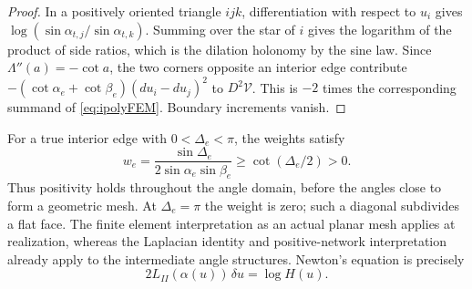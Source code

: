 \documentclass[11pt,a4paper]{article}
\numberwithin{equation}{section}
\theoremstyle{definition}
\theoremstyle{remark}
\begin{document}
\begin{proof}
In a positively oriented triangle $ijk$, differentiation with respect
to $u_i$ gives
$\log(\sin\alpha_{t,j}/\sin\alpha_{t,k})$.
Summing over the star of $i$ gives the logarithm of the product of
side ratios, which is the dilation holonomy by the sine law.
Since $\Lambda''(a)=-\cot a$, the two corners opposite an interior
edge contribute
$-(\cot\alpha_e+\cot\beta_e)(du_i-du_j)^2$ to $D^2\mathcal V$.
This is $-2$ times the corresponding summand of
\eqref{eq:ipolyFEM}. Boundary increments vanish.
\end{proof}

For a true interior edge with $0<\Delta_e<\pi$, the weights satisfy
\begin{equation}
 w_e=\frac{\sin\Delta_e}{2\sin\alpha_e\sin\beta_e}
       \ge\cot(\Delta_e/2)>0.
 \label{eq:ipolyWeightLower}
\end{equation}
Thus positivity holds throughout the angle domain, before the angles
close to form a geometric mesh. At $\Delta_e=\pi$ the weight is zero;
such a diagonal subdivides a flat face. The finite element interpretation
as an actual planar mesh applies at realization, whereas the Laplacian
identity and positive-network interpretation already apply to the
intermediate angle structures. Newton's equation is precisely
\begin{equation}
 2L_{II}(\alpha(u))\,\delta u=\log H(u).
 \label{eq:ipolyNewton}
\end{equation}
\end{document}

